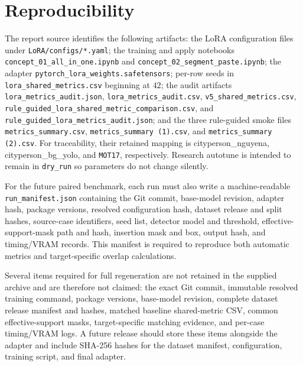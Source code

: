 \documentclass[11pt,a4paper]{article}
\begin{document}
\section*{Reproducibility}
The report source identifies the following artifacts: the LoRA configuration files
under \nolinkurl{LoRA/configs/*.yaml}; the training and apply notebooks
\nolinkurl{concept_01_all_in_one.ipynb} and
\nolinkurl{concept_02_segment_paste.ipynb}; the adapter
\nolinkurl{pytorch_lora_weights.safetensors}; per-row seeds in
\nolinkurl{lora_shared_metrics.csv} beginning at $42$; the audit artifacts
\nolinkurl{lora_metrics_audit.json}, \nolinkurl{lora_metrics_audit.csv},
\nolinkurl{v5_shared_metrics.csv}, \nolinkurl{rule_guided_lora_shared_metric_comparison.csv},
and \nolinkurl{rule_guided_lora_metrics_audit.json}; and the three rule-guided
smoke files \nolinkurl{metrics_summary.csv},
\nolinkurl{metrics_summary (1).csv}, and \nolinkurl{metrics_summary (2).csv}.
For traceability, their retained mapping is
cityperson\allowbreak\_nguyena, cityperson\allowbreak\_bg\allowbreak\_yolo, and
\texttt{MOT17}, respectively. Research autotune is intended to remain in
\texttt{dry\_run} so parameters do not change silently.


For the future paired benchmark, each run must also write a machine-readable \texttt{run\_manifest.json} containing the Git commit, base-model revision, adapter hash, package versions, resolved configuration hash, dataset release and split hashes, source-case identifiers, seed list, detector model and threshold, effective-support-mask path and hash, insertion mask and box, output hash, and timing/VRAM records. This manifest is required to reproduce both automatic metrics and target-specific overlap calculations.

Several items required for full regeneration are not retained in the supplied
archive and are therefore not claimed: the exact Git commit, immutable resolved
training command, package versions, base-model revision, complete dataset release
manifest and hashes, matched baseline shared-metric CSV, common effective-support
masks, target-specific matching evidence, and per-case timing/VRAM logs. A future release should store these items
alongside the adapter and include SHA-256 hashes for the dataset manifest,
configuration, training script, and final adapter.
\end{document}
